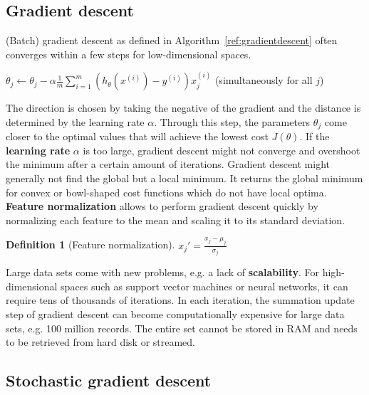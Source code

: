 \documentclass{report}
\newtheorem{definition}{Definition}[section]
\begin{document}
\subsection{Gradient descent}
\label{chapter:gradientdescent}
(Batch) gradient descent as defined in Algorithm~\ref{ref:gradientdescent} often converges within a few steps for low-dimensional spaces.

\begin{algorithm}
\caption{Batch gradient descent}
\label{ref:gradientdescent}
\begin{algorithmic}
\Repeat
\State $\theta_j  \gets \theta_j - \alpha\frac{1}{m}\sum_{i=1}^m (h_\theta(x^{(i)})-y^{(i)})x_j^{(i)}$ (simultaneously for all $j$)
\end{algorithmic}
\end{algorithm}

The direction is chosen by taking the negative of the gradient and the distance is determined by the learning rate $\alpha$.
Through this step, the parameters $\theta_j$ come closer to the optimal values that will achieve the lowest cost $J(\theta)$.
If the {\bf learning rate} $\alpha$ is too large, gradient descent might not converge and overshoot the minimum after a certain amount of iterations.
Gradient descent might generally not find the global but a local minimum.
It returns the global minimum for convex or bowl-shaped cost functions which do not have local optima.
{\bf Feature normalization} allows to perform gradient descent quickly by normalizing each feature to the mean and scaling it to its standard deviation.

\begin{definition}[Feature normalization]
$x_j' = \frac{x_j - \mu_j}{\sigma_j}$
\end{definition}

Large data sets come with new problems, e.g. a lack of {\bf scalability}.
For high-dimensional spaces such as support vector machines or neural networks, it can require tens of thousands of iterations.
In each iteration, the summation update step of gradient descent can become computationally expensive for large data sets, e.g. 100 million records.
The entire set cannot be stored in RAM and needs to be retrieved from hard disk or streamed.


\subsection{Stochastic gradient descent}
\end{document}
